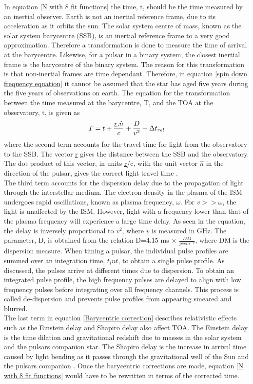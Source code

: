 \documentclass[12pt]{article}
\begin{document}
	\noindent In equation \ref{N with 8 fit functions} the time, t, should be the time measured by an inertial observer. Earth is not an inertial reference frame, due to its acceleration as it orbits the sun. The solar system centre of mass, known as the solar system barycentre (SSB), is an inertial reference frame to a very good approximation. Therefore a transformation is done to measure the time of arrival at the barycentre. Likewise, for a pulsar in a binary system, the closest inertial frame is the barycentre of the binary system. The reason for this transformation is that non-inertial frames are time dependant. Therefore, in equation \ref{spin down frequency equation} it cannot be assumed that the star has aged five years during the five years of observations on earth. The equation for the transformation between the time measured at the barycentre, T, and the TOA at the observatory, t, is given as
	\begin{equation}\label{Barycentric correction}
	T=t+\frac{\uline{r}.\hat{n}}{c}+\frac{D}{v^2}+\Delta t_{rel}
	\end{equation}
	where the second term accounts for the travel time for light from the observatory to the SSB. The vector \uline{r} gives the distance between the SSB and the observatory. The dot product of this vector, in units \uline{r}/c, with the unit vector $\hat{n}$ in the direction of the pulsar, gives the correct light travel time \cite{backer1986pulsar}.\\ 
	
	\noindent The third term accounts for the dispersion delay due to the propagation of light through the interstellar medium. The electron density in the plasma of the ISM undergoes rapid oscillations, known as plasma frequency, $\omega$. For $v>>\omega$, the light is unaffected by the ISM. However, light with a frequency lower than that of the plasma frequency will experience a large time delay. As seen in the equation, the delay is inversely proportional to $v^2$, where $v$ is measured in GHz. The parameter, D, is obtained from the relation D=4.15 ms $\times$ $\frac{DM}{pc cm^{-3}}$, where DM is the dispersion measure. When timing a pulsar, the individual pulse profiles are summed over an integration time, $t_int$, to obtain a single pulse profile. As discussed, the pulses arrive at different times due to dispersion. To obtain an integrated pulse profile, the high frequency pulses are delayed to align with low frequency pulses before integrating over all frequency channels. This process is called de-dispersion and prevents pulse profiles from appearing smeared and blurred.\\
	The last term in equation \ref{Barycentric correction} describes relativistic effects such as the Einstein delay and Shapiro delay also affect TOA. The Einstein delay is the time dilation and gravitational redshift due to masses in the solar system and the pulsars companion star. The Shapiro delay is the increase in arrival time caused by light bending as it passes through the gravitational well of the Sun and the pulsars companion \cite{stairs2003testing}. Once the barycentric corrections are made, equation \ref{N with 8 fit functions} would have to be rewritten in terms of the corrected time.\\  
	
\end{document}
